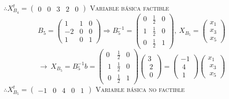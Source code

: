 \begin{itemize}
    $\therefore X_{B_4}^t=\begin{pmatrix}0&0&3&2&0\end{pmatrix}$ \textsc{Variable  básica factible}
    $$ B_5=\begin{pmatrix}1&1&0\\ -2&0&0\\ 1&0&1\end{pmatrix}\Rightarrow B_5^{-1}=\begin{pmatrix}0&\frac{1}{2}&0\\ 1&\frac{1}{2}&0\\ 0&\frac{1}{2}&1\end{pmatrix},\:X_{B_5}=\begin{pmatrix}x_1\\ x_3\\ x_5\end{pmatrix} $$
    $$\rightarrow \:X_{B_5}=B_5^{-1}b=\begin{pmatrix}0&\frac{1}{2}&0\\ \:1&\frac{1}{2}&0\\ \:0&\frac{1}{2}&1\end{pmatrix}\begin{pmatrix}3\\ \:2\\ \:0\end{pmatrix}=\begin{pmatrix}-1\\ \:4\\ \:1\end{pmatrix}\begin{pmatrix}x_1\\ \:x_3\\ \:x_5\end{pmatrix}$$
    $\therefore X_{B_5}^t=\begin{pmatrix}-1&0&4&0&1\end{pmatrix}$ \textsc{Variable  básica no factible}
    

\end{itemize}
